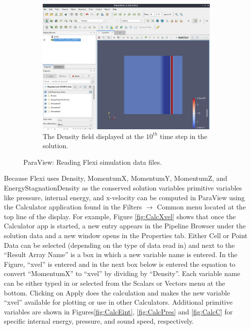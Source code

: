 \begin{appendices}
\begin{figure}[ht]\ContinuedFloat
\centering
\begin{subfigure}{.95\textwidth}
  \centering
  \includegraphics[width=.9\linewidth,height=0.9\linewidth,scale=1]{figures/paraviewGrabs/DensityField.jpg}
  \caption{The Density field displayed at the $10^{th}$ time step in the solution.}
  \label{fig:DensityField}
\end{subfigure}
\caption{ParaView: Reading Flexi simulation data files.}
\label{fig:PVopenFile}
\end{figure}


Because Flexi uses Density, MomentumX, MomentumY, MomentumZ, and EnergyStagnationDensity as the conserved solution variables primitive variables like pressure, internal energy, and x-velocity can be computed in ParaView using the Calculator application found in the Filters $\rightarrow$ Common menu located at the top line of the display.  For example, Figure \ref{fig:CalcXvel} shows that once the Calculator app is started, a new entry appears in the Pipeline Browser under the solution data and a new window opens in the Properties tab.  Either Cell or Point Data can be selected (depending on the type of data read in) and next to the ``Result Array Name'' is a box in which a new variable name is entered.  In the Figure, ``xvel'' is entered and in the next box below is entered the equation to convert ``MomentumX'' to ``xvel'' by dividing by ``Density''.  Each variable name can be either typed in or selected from the Scalars or Vectors menu at the bottom.  Clicking on Apply does the calculation and makes the new variable ``xvel'' available for plotting or use in other Calculators. Additional primitive variables are shown in Figures\ref{fig:CalcEint}, \ref{fig:CalcPres} and \ref{fig:CalcC} for specific internal energy, pressure, and sound speed, respectively.


\end{appendices}
